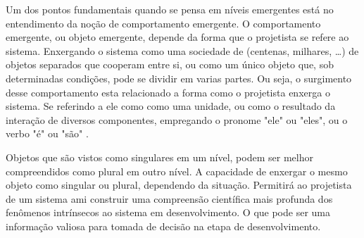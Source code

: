     
    
    Um dos pontos fundamentais quando se pensa em níveis emergentes está no entendimento da noção de comportamento emergente. %
    O comportamento emergente, ou objeto emergente, depende da forma que o projetista se refere ao sistema. Enxergando o sistema como uma sociedade de (centenas, milhares, \ldots) de objetos separados que cooperam entre si, ou como um único objeto que, sob determinadas condições, pode se dividir em varias partes. Ou seja, o surgimento desse comportamento esta relacionado a forma como o projetista enxerga o sistema. Se referindo a ele como como uma unidade, ou como o resultado da interação de diversos componentes, empregando o pronome "ele" ou "eles", ou o verbo "é" ou "são" \cite{wilensky1999thinking}.
    
    Objetos que são vistos como singulares em um nível, podem ser melhor compreendidos como plural em outro nível. A capacidade de enxergar o mesmo objeto como singular ou plural, dependendo da situação. Permitirá ao projetista de um sistema \acrshort{ami} construir uma compreensão científica mais profunda dos fenômenos intrínsecos ao sistema em desenvolvimento. O que pode ser uma informação valiosa para tomada de decisão na etapa de desenvolvimento.%

    
